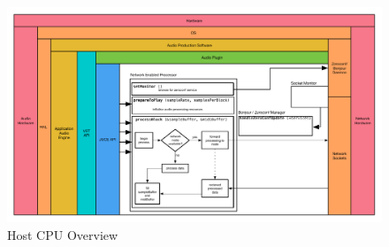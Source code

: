 \begin{figure}[H]
    \centering
    \includegraphics[width=\textwidth]{assets/architecture_02.pdf}
    \caption{Host CPU Overview}
    \label{fig:arch_02}
\end{figure}
